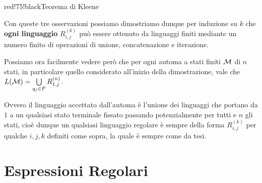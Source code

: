 \begin{halfframedbox}{red!75!black}{Teorema di Kleene}
\begin{itemize}
\begin{center}
  \end{center}
  \medskip

  Con queste tre osservazioni possiamo dimostriamo dunque per induzione su \(k\) che \textbf{ogni linguaggio } \(R^{(k)}_{i,j}\) può essere ottenuto da linguaggi finiti mediante un numero finito di operazioni di unione, concatenazione e iterazione.

  Possiamo ora facilmente vedere però che per ogni automa a stati finiti \(\mathcal{M}\) di \(n\) stati, in particolare quello considerato all'inizio della dimostrazione, vale che \(L(\mathcal{M})= \bigcup\limits_{q_j \in F}R^{(n)}_{1,j}\).

  Ovvero il linguaggio accettato dall'automa è l'unione dei linguaggi che portano da \(1\) a un qualsiasi stato terminale fissato passando potenzialmente per tutti e \(n\) gli stati,
  cioè dunque un qualsiasi linguaggio regolare è sempre della forma \(R^{(k)}_{i,j}\) per qualche \(i,j,k\) definiti come sopra, la quale è sempre come da tesi.
\end{itemize}
\end{halfframedbox}

\newpage

\section{Espressioni Regolari}

